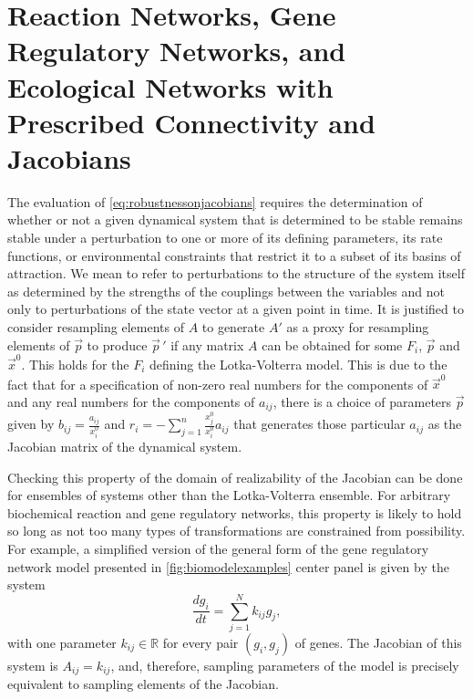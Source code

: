 

\section{Reaction Networks, Gene Regulatory Networks, and Ecological Networks with Prescribed Connectivity and Jacobians}\label{sec:reactionnetjacobian}

The evaluation of \ref{eq:robustnessonjacobians} requires the determination of whether or not a given dynamical system that is determined to be stable remains stable under a perturbation to one or more of its defining parameters, its rate functions, or environmental constraints that restrict it to a subset of its basins of attraction. We mean to refer to perturbations to the structure of the system itself as determined by the strengths of the couplings between the variables and not only to perturbations of the state vector at a given point in time. It is justified to consider resampling elements of $A$ to generate $A'$ as a proxy for resampling elements of $\vec{p}$ to produce $\vec{p}\,'$ if any matrix $A$ can be obtained for some $F_i$, $\vec{p}$ and $\vec{x}^0$. This holds for the $F_i$ defining the Lotka-Volterra model. This is due to the fact that for a specification of non-zero real numbers for the components of $\vec{x}^0$ and any real numbers for the components of $a_{ij}$, there is a choice of parameters $\vec{p}$ given by $b_{ij} = \frac{a_{ij}}{x_i^0}$ and $r_i = - \sum_{j=1}^n \frac{x_j^0}{x_i^0} a_{ij}$ that generates those particular $a_{ij}$ as the Jacobian matrix of the dynamical system.

Checking this property of the domain of realizability of the Jacobian can be done for ensembles of systems other than the Lotka-Volterra ensemble. For arbitrary biochemical reaction and gene regulatory networks, this property is likely to hold so long as not too many types of transformations are constrained from possibility. For example, a simplified version of the general form of the gene regulatory network model presented in \ref{fig:biomodelexamples} center panel is given by the system
\begin{equation}
\frac{dg_i}{dt} = \sum_{j=1}^N k_{ij} g_j,
\end{equation}
with one parameter $k_{ij} \in \mathbb{R}$ for every pair $(g_i,g_j)$ of genes. The Jacobian of this system is $A_{ij} = k_{ij}$, and, therefore, sampling parameters of the model is precisely equivalent to sampling elements of the Jacobian.

